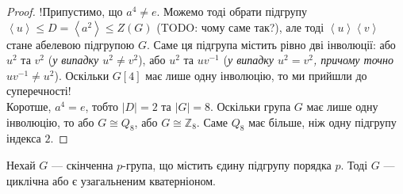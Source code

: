 \documentclass{math_library}
\begin{document}
\begin{proof}
!Припустимо, що $a^4 \neq e$. Можемо тоді обрати підгрупу $\left<u\right> \leq D = \left<a^2\right> \leq Z(G)$ (TODO: чому саме так?), але тоді $\left<u\right>\left<v\right>$ стане абелевою підгрупою $G$. Саме ця підгрупа містить рівно дві інволюції: або $u^2$ та $v^2$ (\textit{у випадку $u^2 \neq v^2$}), або $u^2$ та $uv^{-1}$ (\textit{у випадку $u^2 = v^2$, причому точно $uv^{-1} \neq u^2$}). Оскільки $G[4]$ має лише одну інволюцію, то ми прийшли до суперечності!\\
Коротше, $a^4 = e$, тобто $|D| = 2$ та $|G| = 8$. Оскільки група $G$ має лише одну інволюцію, то або $G \cong Q_8$, або $G \cong \mathbb{Z}_8$. Саме $Q_8$ має більше, ніж одну підгрупу індекса $2$.
\end{proof}

\begin{theorem}
Нехай $G$ --- скінченна $p$-група, що містить єдину підгрупу порядка $p$. Тоді $G$ --- циклічна або є узагальненим кватерніоном.
\end{theorem}
\end{document}
